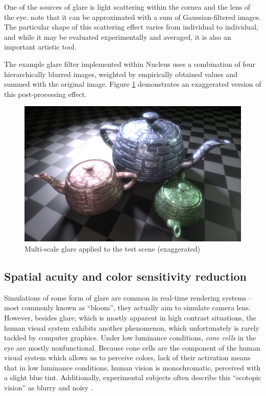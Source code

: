 One of the sources of glare is light scattering within the cornea and the lens of the eye. \citet{Spencer95physicallybasedglare} note that it can be approximated with a sum of Gaussian-filtered images. The particular shape of this scattering effect varies from individual to individual, and while it may be evaluated experimentally and averaged, it is also an important artistic tool.

The example glare filter implemented within Nucleus uses a combination of four hierarchically blurred images, weighted by empirically obtained values and summed with the original image. Figure \ref{fig:postProcGlare} demonstrates an exaggerated version of this post-processing effect.

\begin{figure}[h!]
  \centering
    \includegraphics[width=0.9\linewidth]{./Figures/postProc/glare.jpg}
    \caption[Glare]{Multi-scale glare applied to the test scene (exaggerated)}
  \label{fig:postProcGlare}
\end{figure}

\subsection{Spatial acuity and color sensitivity reduction}

Simulations of some form of glare are common in real-time rendering systems -- most commonly known as ``bloom'', they actually aim to simulate camera lens. However, besides glare, which is mostly apparent in high contrast situations, the human visual system exhibits another phenomenon, which unfortunately is rarely tackled by computer graphics. Under low luminance conditions, \emph{cone cells} in the eye are mostly nonfunctional. Because cone cells are the component of the human visual system which allows us to perceive colors, lack of their activation means that in low luminance conditions, human vision is monochromatic, perceived with a slight blue tint. Additionally, experimental subjects often describe this ``scotopic vision'' as blurry and noisy \cite{Thompson_aspatial}.

